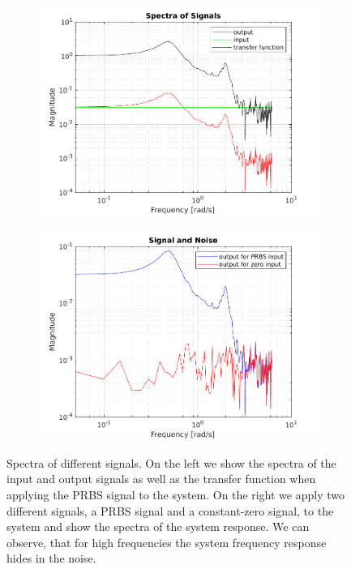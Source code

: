 \documentclass{scrartcl}
\begin{document}
\begin{figure}[h!]
	\centering
	\begin{subfigure}{0.49\textwidth}
		\includegraphics[width=\textwidth]{figures/ffts.pdf}
		\label{fig:ffts_diff}
	\end{subfigure}
	\begin{subfigure}{0.49\textwidth}
		\includegraphics[width=\textwidth]{figures/ffts_snr.pdf}
		\label{fig:ffts_snr}
	\end{subfigure}
	\caption{Spectra of different signals. On the left we show the spectra of the input and output signals as well as the transfer function when applying the PRBS signal to the system. On the right we apply two different signals, a PRBS signal and a constant-zero signal, to the system and show the spectra of the system response. We can observe, that for high frequencies the system frequency response hides in the noise.}
\end{figure}
\end{document}
